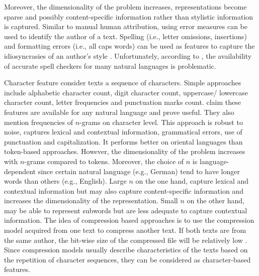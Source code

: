 Moreover, the dimensionality of the problem increases, representations become sparse and possibly content-specific information rather than stylistic information is captured.
Similar to manual human attribution, using error measures can be used to identify the author of a text.
Spelling (i.e., letter omissions, insertions) and formatting errors (i.e., all caps words) can be used as features 
to capture the idiosyncrasies of an author's style \citep{elmanarelbouanani_authorship_2014,bevendorff_overview_2024}.
Unfortunately, according to \citep{stamatatos_survey_2009}, the availability of accurate spell checkers for many natural languages is problematic.


Character feature consider texts a sequence of characters.
Simple approaches include alphabetic character count, digit character count, uppercase/ lowercase character count, letter frequencies and punctuation marks count.
\citet{stamatatos_survey_2009} claim these features are available for any natural language and prove useful.
They also mention frequencies of $n$-grams on character level.
This approach is robust to noise, captures lexical and contextual information, grammatical errors, use of punctuation and capitalization.
It performs better on oriental languages than token-based approaches.
However, the dimensionality of the problem increases with $n$-grams compared to tokens.
Moreover, the choice of $n$ is language-dependent since certain natural language (e.g., German) tend to have longer words than others (e.g., English).
Large $n$ on the one hand, capture lexical and contextual information but may also capture content-specific information and increases the dimensionality of the representation.
Small $n$ on the other hand, may be able to represent subwords but are less adequate to capture contextual information.
The idea of compression based approaches is to use the compression model acquired from one text to compress another text. 
If both texts are from the same author, the bit-wise size of the compressed file will be relatively low \citep{stamatatos_survey_2009,neal_surveying_2018}.
Since compression models usually describe characteristics of the texts based on the repetition of character sequences, 
they can be considered as character-based features. 


